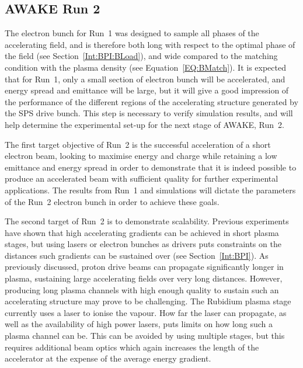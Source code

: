 \subsection{AWAKE Run 2}
\label{WFA:AWAKE:R2}

The electron bunch for Run~1 was designed to sample all phases of the accelerating field, and is therefore both long with respect to the optimal phase of the field (see Section~\ref{Int:BPI:BLoad}), and wide compared to the matching condition with the plasma density (see Equation~\ref{EQ:BMatch}).
It is expected that for Run~1, only a small section of electron bunch will be accelerated, and energy spread and emittance will be large, but it will give a good impression of the performance of the different regions of the accelerating structure generated by the SPS drive bunch.
This step is necessary to verify simulation results, and will help determine the experimental set-up for the next stage of AWAKE, Run~2.

The first target objective of Run~2 is the successful acceleration of a short electron beam, looking to maximise energy and charge while retaining a low emittance and energy spread in order to demonstrate that it is indeed possible to produce an accelerated beam with sufficient quality for further experimental applications.
The results from Run~1 and simulations will dictate the parameters of the Run~2 electron bunch in order to achieve these goals.

The second target of Run~2 is to demonstrate scalability.
Previous experiments have shown that high accelerating gradients can be achieved in short plasma stages, but using lasers or electron bunches as drivers puts constraints on the distances such gradients can be sustained over (see Section~\ref{Int:BPI}).
As previously discussed, proton drive beams can propagate significantly longer in plasma, sustaining large accelerating fields over very long distances.
However, producing long plasma channels with high enough quality to sustain such an accelerating structure may prove to be challenging.
The Rubidium plasma stage currently uses a laser to ionise the vapour.
How far the laser can propagate, as well as the availability of high power lasers, puts limits on how long such a plasma channel can be.
This can be avoided by using multiple stages, but this requires additional beam optics which again increases the length of the accelerator at the expense of the average energy gradient.

